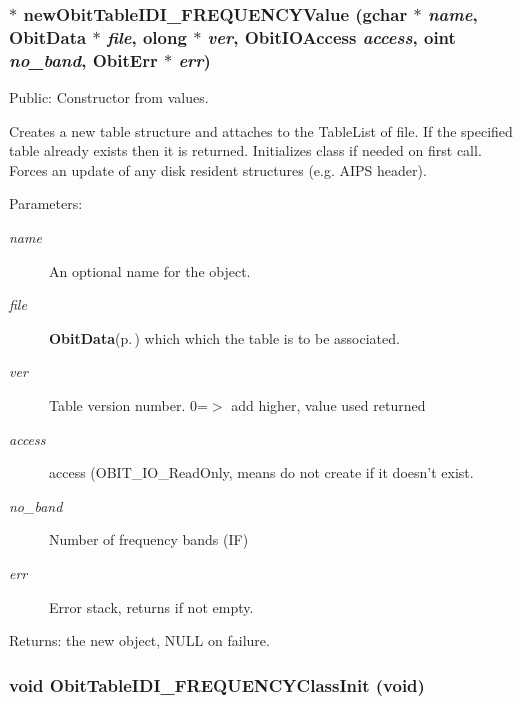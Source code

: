 \subsubsection{$\ast$ new\-Obit\-Table\-IDI\_\-FREQUENCYValue (gchar $\ast$ {\em name}, {\bf Obit\-Data} $\ast$ {\em file}, {\bf olong} $\ast$ {\em ver}, Obit\-IOAccess {\em access}, {\bf oint} {\em no\_\-band}, {\bf Obit\-Err} $\ast$ {\em err})}\label{ObitTableIDI__FREQUENCY_8c_a18}


Public: Constructor from values. 

Creates a new table structure and attaches to the Table\-List of file. If the specified table already exists then it is returned. Initializes class if needed on first call. Forces an update of any disk resident structures (e.g. AIPS header). \begin{Desc}
\item[Parameters:]
\begin{description}
\item[{\em name}]An optional name for the object. \item[{\em file}]{\bf Obit\-Data}{\rm (p.\,\pageref{structObitData})} which which the table is to be associated. \item[{\em ver}]Table version number. 0=$>$ add higher, value used returned \item[{\em access}]access (OBIT\_\-IO\_\-Read\-Only, means do not create if it doesn't exist. \item[{\em no\_\-band}]Number of frequency bands (IF) \item[{\em err}]Error stack, returns if not empty. \end{description}
\end{Desc}
\begin{Desc}
\item[Returns:]the new object, NULL on failure. \end{Desc}
\subsubsection{\setlength{\rightskip}{0pt plus 5cm}void Obit\-Table\-IDI\_\-FREQUENCYClass\-Init (void)}\label{ObitTableIDI__FREQUENCY_8c_a27}


